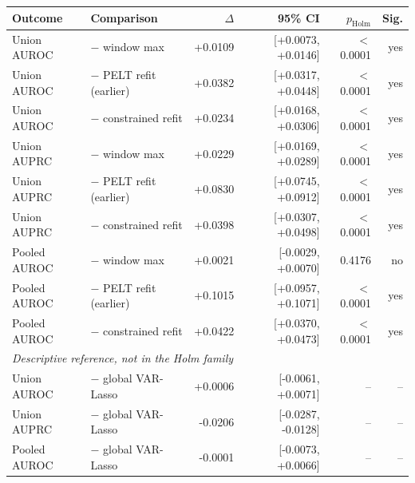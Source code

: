 \begin{tabular}{llrrrr}
\toprule
Outcome & Comparison & $\Delta$ & 95\% CI & $p_{\mathrm{Holm}}$ & Sig. \\
\midrule
Union AUROC & $-$ window max & +0.0109 & [+0.0073, +0.0146] & $<$0.0001 & yes \\
Union AUROC & $-$ PELT refit (earlier) & +0.0382 & [+0.0317, +0.0448] & $<$0.0001 & yes \\
Union AUROC & $-$ constrained refit & +0.0234 & [+0.0168, +0.0306] & $<$0.0001 & yes \\
Union AUPRC & $-$ window max & +0.0229 & [+0.0169, +0.0289] & $<$0.0001 & yes \\
Union AUPRC & $-$ PELT refit (earlier) & +0.0830 & [+0.0745, +0.0912] & $<$0.0001 & yes \\
Union AUPRC & $-$ constrained refit & +0.0398 & [+0.0307, +0.0498] & $<$0.0001 & yes \\
Pooled AUROC & $-$ window max & +0.0021 & [-0.0029, +0.0070] & 0.4176 & no \\
Pooled AUROC & $-$ PELT refit (earlier) & +0.1015 & [+0.0957, +0.1071] & $<$0.0001 & yes \\
Pooled AUROC & $-$ constrained refit & +0.0422 & [+0.0370, +0.0473] & $<$0.0001 & yes \\
\midrule
\multicolumn{6}{l}{\emph{Descriptive reference, not in the Holm family}} \\
Union AUROC & $-$ global VAR-Lasso & +0.0006 & [-0.0061, +0.0071] & -- & -- \\
Union AUPRC & $-$ global VAR-Lasso & -0.0206 & [-0.0287, -0.0128] & -- & -- \\
Pooled AUROC & $-$ global VAR-Lasso & -0.0001 & [-0.0073, +0.0066] & -- & -- \\
\bottomrule
\end{tabular}
